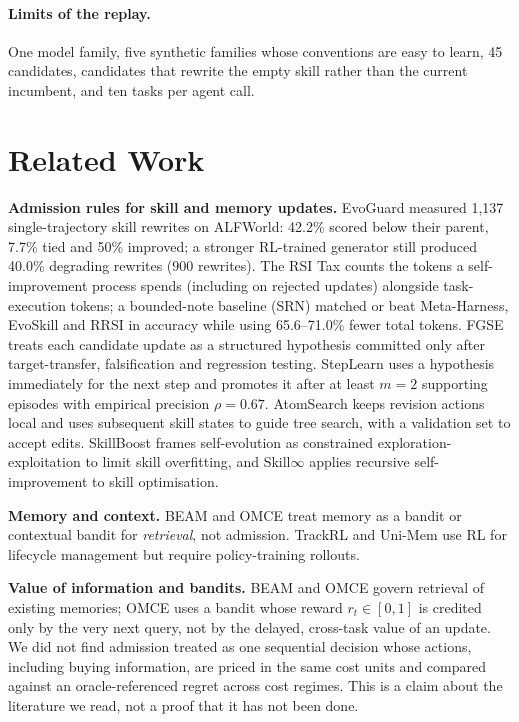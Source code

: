 \documentclass[11pt]{article}
\begin{document}
\paragraph{Limits of the replay.}  One model family, five synthetic families whose conventions
are easy to learn, 45 candidates, candidates that rewrite the empty skill rather than the
current incumbent, and ten tasks per agent call.

\section{Related Work}
\textbf{Admission rules for skill and memory updates.}  EvoGuard \citep{evo2026} measured
1,137 single-trajectory skill rewrites on ALFWorld: 42.2\% scored below their parent, 7.7\%
tied and 50\% improved; a stronger RL-trained generator still produced 40.0\% degrading
rewrites (900 rewrites).  The RSI Tax \citep{ristax2026} counts the tokens a
self-improvement process spends (including on rejected updates) alongside task-execution
tokens; a bounded-note baseline (SRN) matched or beat Meta-Harness, EvoSkill and RRSI in
accuracy while using 65.6--71.0\% fewer total tokens.  FGSE \citep{fgse2026} treats each
candidate update as a structured hypothesis committed only after target-transfer,
falsification and regression testing.  StepLearn \citep{steplearn2026} uses a hypothesis
immediately for the next step and promotes it after at least $m=2$ supporting episodes with
empirical precision $\rho = 0.67$.  AtomSearch \citep{atom2026} keeps revision actions local
and uses subsequent skill states to guide tree search, with a validation set to accept
edits.  SkillBoost \citep{skillboost2026} frames self-evolution as constrained
exploration-exploitation to limit skill overfitting, and Skill$\infty$ \citep{skillinf2026}
applies recursive self-improvement to skill optimisation.

\textbf{Memory and context.}  BEAM \citep{beam2026} and OMCE \citep{omce2026} treat memory
as a bandit or contextual bandit for \emph{retrieval}, not admission.  TrackRL
\citep{trackrl2026} and Uni-Mem \citep{unimem2026} use RL for lifecycle management but
require policy-training rollouts.

\textbf{Value of information and bandits.}  BEAM and OMCE govern retrieval of existing
memories; OMCE uses a bandit whose reward $r_t \in [0,1]$ is credited only by the very next
query, not by the delayed, cross-task value of an update.  We did not find admission treated
as one sequential decision whose actions, including buying information, are priced in the
same cost units and compared against an oracle-referenced regret across cost regimes.  This
is a claim about the literature we read, not a proof that it has not been done.
\end{document}
